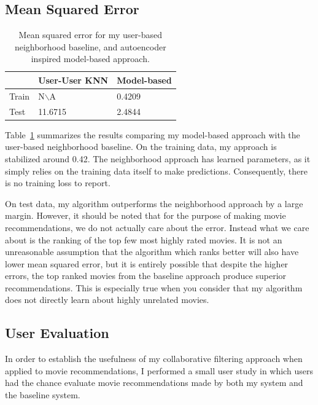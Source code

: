 \documentclass[12pt]{article}
\begin{document}
\subsection{Mean Squared Error}

\begin{table}
\centering
\begin{tabular}{|l|l|l|}
\hline
& User-User KNN & Model-based\\\hline
Train & N$\backslash$A & 0.4209\\\hline
Test & 11.6715 & 2.4844\\\hline
\end{tabular}
\caption{Mean squared error for my user-based neighborhood baseline, and
autoencoder inspired model-based approach.}
\label{tab:mse}
\end{table}

Table~\ref{tab:mse} summarizes the results comparing my model-based approach
with the user-based neighborhood baseline.
On the training data, my approach is stabilized around 0.42.
The neighborhood approach has learned parameters, as it simply relies on the
training data itself to make predictions.
Consequently, there is no training loss to report.

On test data, my algorithm outperforms the neighborhood approach by a large
margin.
However, it should be noted that for the purpose of making movie
recommendations, we do not actually care about the error.
Instead what we care about is the ranking of the top few most highly rated
movies.
It is not an unreasonable assumption that the algorithm which ranks
better will also have lower mean squared error,
but it is entirely possible that despite the higher errors, the top ranked
movies from the baseline approach produce superior recommendations.
This is especially true when you consider that my algorithm does not directly
learn about highly unrelated movies.

\subsection{User Evaluation}

In order to establish the usefulness of my collaborative filtering approach
when applied to movie recommendations, I performed a small user study in which
users had the chance evaluate movie recommendations made by both my system and
the baseline system.
\end{document}
